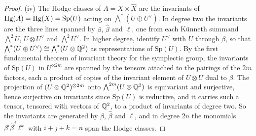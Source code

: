 \begin{proof}
(iv) The Hodge classes of $A=X\times\widehat{X}$ are the invariants of
$\operatorname{Hg}(A)=\operatorname{Hg}(X)=\mathrm{Sp}(U)$ acting on
$\bigwedge^{*}(U\oplus U^{\vee})$. In degree two the invariants are the three
lines spanned by $\beta$, $\widehat{\beta}$ and $\ell$, one from each
K\"unneth summand $\bigwedge^{2}U$, $U\otimes U^{\vee}$ and
$\bigwedge^{2}U^{\vee}$. In higher degree, identify $U^{\vee}$ with $U$
through $\beta$, so that $\bigwedge^{*}(U\oplus U^{\vee})\cong
\bigwedge^{*}(U\otimes\mathbb{Q}^{2})$ as representations of $\mathrm{Sp}(U)$. By the
first fundamental theorem of invariant theory for the symplectic group, the
invariants of $\mathrm{Sp}(U)$ in $U^{\otimes2m}$ are spanned by the tensors
attached to the pairings of the $2m$ factors, each a product of copies of the
invariant element of $U\otimes U$ dual to $\beta$. The projection of
$(U\otimes\mathbb{Q}^{2})^{\otimes2m}$ onto $\bigwedge^{2m}(U\otimes\mathbb{Q}^{2})$ is
equivariant and surjective, hence surjective on invariants since
$\mathrm{Sp}(U)$ is reductive, and it carries such a tensor, tensored with
vectors of $\mathbb{Q}^{2}$, to a product of invariants of degree two. So the
invariants are generated by $\beta$, $\widehat{\beta}$ and $\ell$, and in
degree $2n$ the monomials $\beta^{i}\widehat{\beta}^{j}\ell^{k}$ with
$i+j+k=n$ span the Hodge classes.
\end{proof}

